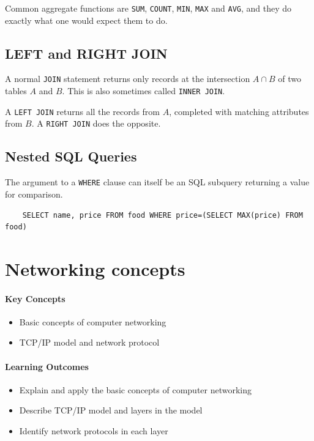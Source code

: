 Common aggregate functions are \texttt{SUM}, \texttt{COUNT}, \texttt{MIN}, \texttt{MAX} and \texttt{AVG}, and they do exactly what one would expect them to do.

\subsection{LEFT and RIGHT JOIN}
A normal \texttt{JOIN} statement returns only records at the intersection \( A \cap B\) of two tables \( A \) and \( B \). This is also sometimes called \texttt{INNER JOIN}.

A \texttt{LEFT JOIN} returns all the records from \( A \), completed with matching attributes from \( B \). A \texttt{RIGHT JOIN} does the opposite.  

\subsection{Nested SQL Queries}

The argument to a \texttt{WHERE} clause can itself be an SQL subquery returning a value for comparison.

\begin{verbatim}
	SELECT name, price FROM food WHERE price=(SELECT MAX(price) FROM food)
\end{verbatim}

\section{Networking concepts}

\begin{mdframed}

\paragraph{Key Concepts}
\begin{itemize}[label={\checkmark}]
\item Basic concepts of computer networking
\item TCP/IP model and network protocol
\end{itemize}

\paragraph{Learning Outcomes}
\begin{itemize}[label={\checkmark}]
\item Explain and apply the basic concepts of computer networking
\item Describe TCP/IP model and layers in the model 
\item Identify network protocols in each layer
\end{itemize}
\end{mdframed}

